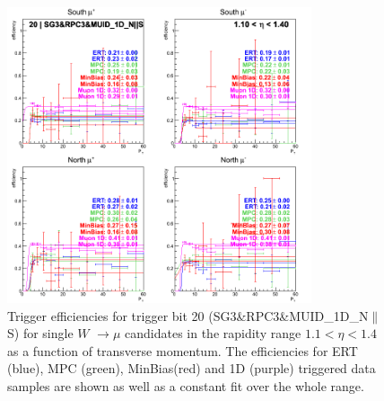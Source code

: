 \begin{figure}[h!]

  \centering

  \includegraphics[width=0.8\textwidth]{./figures/run13_trigeffipt_eta0_trig20_lin.png}
  \caption{\label{fig:run13_trigeffipt_eta0_nper0_trig20_lin} Trigger efficiencies for trigger bit 20 (SG3\&RPC3\&MUID\_1D\_N$\|$S) for single $W$ $\rightarrow \mu$ candidates in the rapidity range $ 1.1 < \eta < 1.4$ as a function of transverse momentum. The efficiencies for ERT (blue), MPC (green), MinBias(red) and 1D (purple) triggered data samples are shown as well as a constant fit over the whole range.}

\end{figure}
\clearpage
